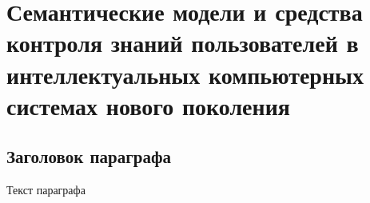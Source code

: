 \chapter{Семантические модели и средства контроля знаний пользователей в интеллектуальных компьютерных системах нового поколения}
\label{chapter_knowledge_control}


\section{Заголовок параграфа}
Текст параграфа

%